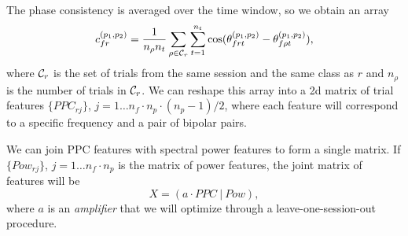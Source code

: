 \documentclass[a4paper]{article}
\begin{document}
The phase consistency is averaged over the time window, so we obtain an array
\[c_{fr}^{(p_1,p_2)} = \frac{1}{n_{\rho} n_t} \sum_{\rho \in {\cal C}_r} \sum_{t=1}^{n_t} \cos(\theta_{frt}^{(p_1,p_2)} - \theta_{f \rho t}^{(p_1,p_2)}), \]
where ${\cal C}_r$ is the set of trials from the same session and the same class as $r$ and
$n_{\rho}$ is the number of trials in ${\cal C}_r$. We can reshape this array into a 2d
matrix of trial features $\{PPC_{rj}\}$, $j=1 \ldots n_f \cdot n_p \cdot (n_p-1) / 2$,
where each feature will correspond to a specific frequency and a pair of bipolar pairs.

We can join PPC features with spectral power features to form a single matrix. If
$\{Pow_{rj}\}$, $j=1 \ldots n_f \cdot n_p$ is the matrix of power features, the
joint matrix of features will be
\begin{equation}
\label{eq:features_matrix}
X = \left(a \cdot PPC \ | \ Pow\right),
\end{equation}
where $a$ is an {\em amplifier\/} that we will optimize through a leave-one-session-out
procedure.
\end{document}
